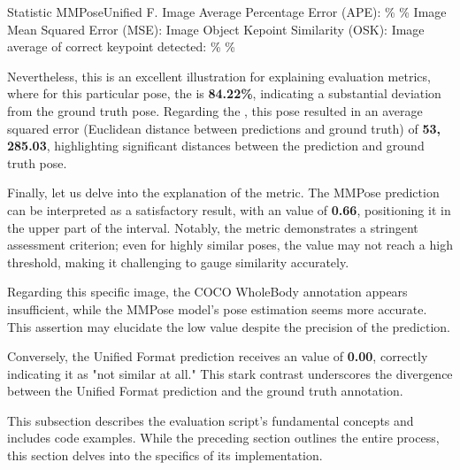  \setupTABLE[r][1][style=bold]
 \setupTABLE[c][each][offset=3dd]
 \setupTABLE[frame=off]
 \setupTABLE[r][1][topframe=on,bottomframe=on]
 \setupTABLE[c][each][leftframe=on]
 \setupTABLE[c][1][leftframe=off]
 \setupTABLE[c][2,3][align=middle]
 \bTR\bTD Statistic \eTD\bTD MMPose\eTD\bTD Unified F.\eTD\eTR
 \bTR\bTD Image Average Percentage Error (APE): \eTD{}\% \eTD{}\% \eTD\eTR
 \bTR\bTD Image Mean Squared Error (MSE): \eTD{} \eTD{} \eTD\eTR
 \bTR\bTD Image Object Kepoint Similarity (OSK): \eTD{} \eTD{} \eTD\eTR
 \bTR\bTD Image average of correct keypoint detected: \eTD{}\% \eTD{}\% \eTD\eTR

Nevertheless, this is an excellent illustration for explaining evaluation metrics, where for this particular pose, the {\bf \APE} is {\bf 84.22\%}, indicating a substantial deviation from the ground truth pose. Regarding the {\bf \MSE}, this pose resulted in an average squared error (Euclidean distance between predictions and ground truth) of {\bf 53,\,285.03}, highlighting significant distances between the prediction and ground truth pose.

Finally, let us delve into the explanation of the {\bf \OKS} metric. The MMPose prediction can be interpreted as a satisfactory result, with an {\bf \OKS} value of {\bf 0.66}, positioning it in the upper part of the interval. Notably, the {\bf \OKS} metric demonstrates a stringent assessment criterion; even for highly similar poses, the value may not reach a high threshold, making it challenging to gauge similarity accurately.

Regarding this specific image, the COCO WholeBody annotation appears insufficient, while the MMPose model's pose estimation seems more accurate. This assertion may elucidate the low {\bf \OKS} value despite the precision of the prediction.

Conversely, the Unified Format prediction receives an {\bf \OKS} value of {\bf 0.00}, correctly indicating it as "not similar at all." This stark contrast underscores the divergence between the Unified Format prediction and the ground truth annotation.


This subsection describes the evaluation script's fundamental concepts and includes code examples. While the preceding section outlines the entire process, this section delves into the specifics of its implementation.

